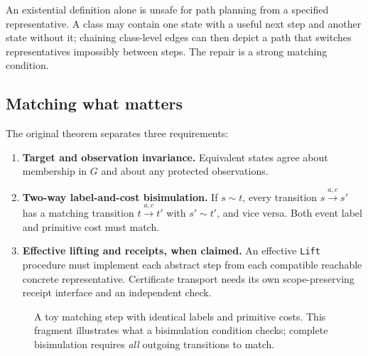 \documentclass[11pt,letterpaper]{article}
\theoremstyle{plaincompact}
\begin{document}
An existential definition alone is unsafe for path planning from a specified representative. A class may contain one state with a useful next step and another state without it; chaining class-level edges can then depict a path that switches representatives impossibly between steps. The repair is a strong matching condition.

\subsection{Matching what matters}
The original theorem separates three requirements:
\begin{enumerate}
\item \textbf{Target and observation invariance.} Equivalent states agree about membership in $G$ and about any protected observations.
\item \textbf{Two-way label-and-cost bisimulation.} If $s\sim t$, every transition $s\xrightarrow{a,c}s'$ has a matching transition $t\xrightarrow{a,c}t'$ with $s'\sim t'$, and vice versa. Both event label and primitive cost must match.
\item \textbf{Effective lifting and receipts, when claimed.} An effective \texttt{Lift} procedure must implement each abstract step from each compatible reachable concrete representative. Certificate transport needs its own scope-preserving receipt interface and an independent check.
\end{enumerate}

\begin{figure}[htbp]
\centering
{}
\caption{A toy matching step with identical labels and primitive costs. This fragment illustrates what a bisimulation condition checks; complete bisimulation requires \emph{all} outgoing transitions to match.}
\end{figure}
\end{document}
